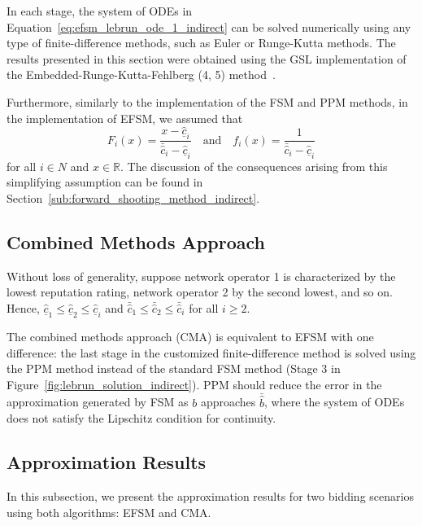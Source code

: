 In each stage, the system of ODEs in Equation~\eqref{eq:efsm_lebrun_ode_1_indirect} can be solved numerically using any type of finite-difference methods, such as Euler or Runge-Kutta methods. The results presented in this section were obtained using the GSL implementation of the Embedded-Runge-Kutta-Fehlberg (4, 5) method~\cite{GSL}.

Furthermore, similarly to the implementation of the FSM and PPM methods, in the implementation of EFSM, we assumed that
\begin{equation*}
  F_i(x) = \frac{x - \underline{\hat{c}}_i}{\bar{\hat{c}}_i - \underline{\hat{c}}_i} \quad\text{and}\quad f_i(x) = \frac{1}{\bar{\hat{c}}_i - \underline{\hat{c}}_i}
\end{equation*}
for all $i\in N$ and $x\in\mathbb{R}$. The discussion of the consequences arising from this simplifying assumption can be found in Section~\ref{sub:forward_shooting_method_indirect}.


\subsection{Combined Methods Approach} %
\label{sub:combined_methods_approach_indirect}
Without loss of generality, suppose network operator 1 is characterized by the lowest reputation rating, network operator 2 by the second lowest, and so on. Hence, $\underline{\hat{c}}_1\leq \underline{\hat{c}}_2\leq \underline{\hat{c}}_i$ and $\bar{\hat{c}}_1\leq \bar{\hat{c}}_2\leq \bar{\hat{c}}_i$ for all $i\geq 2$.

The combined methods approach (CMA) is equivalent to EFSM with one difference: the last stage in the customized finite-difference method is solved using the PPM method instead of the standard FSM method (Stage 3 in Figure~\ref{fig:lebrun_solution_indirect}). PPM should reduce the error in the approximation generated by FSM as $b$ approaches $\bar{\hat{b}}$, where the system of ODEs does not satisfy the Lipschitz condition for continuity.

\subsection{Approximation Results} %
\label{sub:approximation_results_indirect}
In this subsection, we present the approximation results for two bidding scenarios using both algorithms: EFSM and CMA.

